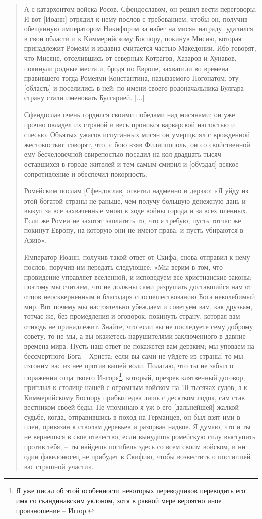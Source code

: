 \begin{quotation}
А с катархонтом войска Росов, Сфендославом, он решил вести переговоры. И вот [Иоанн] отрядил к нему послов с требованием, чтобы он, получив обещанную императором Никифором за набег на мисян награду, удалился в свои области и к Киммерийскому Боспору, покинув Мисию, которая принадлежит Ромеям и издавна считается частью Македонии. Ибо говорят, что Мисяне, отселившись от северных Котрагов, Хазаров и Хунавов, покинули родные места и, бродя по Европе, захватили во времена правившего тогда Ромеями Константина, называемого Погонатом, эту [область] и поселились в ней; по имени своего родоначальника Булгара страну стали именовать Булгарией. [...]

Сфендослав очень гордился своими победами над мисянами; он уже прочно овладел их страной и весь проникся варварской наглостью и спесью. Объятых ужасов испуганных мисян он умерщвлял с врожденной жестокостью: говорят, что, с бою взяв Филиппополь, он со свойственной ему бесчеловечной свирепостью посадил на кол двадцать тысяч оставшихся в городе жителей и тем самым смирил и [обуздал] всякое сопротивление и обеспечил покорность. 

Ромейским послам [Сфендослав] ответил надменно и дерзко: «Я уйду из этой богатой страны не раньше, чем получу большую денежную дань и выкуп за все захваченные мною в ходе войны города и за всех пленных. Если же Ромеи не захотят заплатить то, что я требую, пусть тотчас же покинут Европу, на которую они не имеют права, и пусть убираются в Азию».

Император Иоанн, получив такой ответ от Скифа, снова отправил к нему послов, поручив им передать следующее: «Мы верим в том, что провидение управляет вселенной, и исповедуем все христианские законы; поэтому мы считаем, что не должны сами разрушать доставшийся нам от отцов неоскверненным и благодаря споспешествованию Бога неколебимый мир. Вот почему мы настоятельно убеждаем и советуем вам, как друзьям, тотчас же, без промедления и оговорок, покинуть страну, которая вам отнюдь не принадлежит. Знайте, что если вы не последуете сему доброму совету, то не мы, а вы окажетесь нарушителями заключенного в давние времена мира. Пусть наш ответ не покажется вам дерзким; мы уповаем на бессмертного Бога – Христа: если вы сами не уйдете из страны, то мы изгоним вас из нее против вашей воли. Полагаю, что ты не забыл о поражении отца твоего Ингоря\footnote{Я уже писал об этой особенности некоторых переводчиков переводить его имя со скандинавским уклоном, хотя в равной мере вероятно иное произношение – Иггор.}, который, презрев клятвенный договор, приплыл к столице нашей с огромным войском на 10 тысячах судов, а к Киммерийскому Боспору прибыл едва лишь с десятком лодок, сам став вестником своей беды. Не упоминаю я уж о его [дальнейшей] жалкой судьбе, когда, отправившись в поход на Германцев, он был взят ими в плен, привязан к стволам деревьев и разорван надвое. Я думаю, что и ты не вернешься в свое отечество, если вынудишь ромейскую силу выступить против тебя, – ты найдешь погибель здесь со всем своим войском, и ни один факелоносец не прибудет в Скифию, чтобы возвестить о постигшей вас страшной участи».
\end{quotation}

